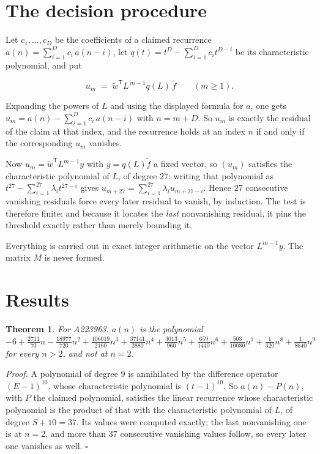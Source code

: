 \documentclass[11pt]{article}
\newtheorem{theorem}{Theorem}
\theoremstyle{definition}
\begin{document}
\section{The decision procedure}

Let $c_1,\dots,c_D$ be the coefficients of a claimed recurrence $a(n) = \sum_{i=1}^{D} c_i\,a(n-i)$, let $q(t) = t^{D} - \sum_{i=1}^{D} c_i t^{D-i}$ be its characteristic polynomial, and put

\[u_m \;=\; \tilde w^{\mathsf T} L^{\,m-1} q(L)\,\tilde f \qquad (m \ge 1).\]

Expanding the powers of $L$ and using the displayed formula for $a$, one gets $u_m = a(n) - \sum_{i=1}^{D} c_i\,a(n-i)$ with $n = m + D$. So $u_m$ is exactly the residual of the claim at that index, and the recurrence holds at an index $n$ if and only if the corresponding $u_m$ vanishes.

Now $u_m = \tilde w^{\mathsf T} L^{m-1} y$ with $y = q(L)\tilde f$ a fixed vector, so $(u_m)$ satisfies the characteristic polynomial of $L$, of degree $27$: writing that polynomial as $t^{27} - \sum_{i=1}^{27} \lambda_i t^{27-i}$ gives $u_{m+27} = \sum_{i=1}^{27} \lambda_i u_{m+27-i}$. Hence $27$ consecutive vanishing residuals force every later residual to vanish, by induction. The test is therefore finite; and because it locates the {\itshape last} nonvanishing residual, it pins the threshold exactly rather than merely bounding it.

Everything is carried out in exact integer arithmetic on the vector $L^{m-1}y$. The matrix $M$ is never formed.

\section{Results}

\begin{theorem} For A223963, $a(n)$ is the polynomial $-6 + \frac{2711}{70}n - \frac{18977}{720}n^{2} + \frac{106019}{2160}n^{3} + \frac{37141}{2880}n^{4} + \frac{3013}{960}n^{5} + \frac{659}{1440}n^{6} + \frac{503}{10080}n^{7} + \frac{1}{320}n^{8} + \frac{1}{8640}n^{9}$ for every $n > 2$, and not at $n = 2$.\end{theorem}

{\itshape Proof.} A polynomial of degree $9$ is annihilated by the difference operator $(E-1)^{10}$, whose characteristic polynomial is $(t-1)^{10}$. So $a(n) - P(n)$, with $P$ the claimed polynomial, satisfies the linear recurrence whose characteristic polynomial is the product of that with the characteristic polynomial of $L$, of degree $S + 10 = 37$. Its values were computed exactly; the last nonvanishing one is at $n = 2$, and more than $37$ consecutive vanishing values follow, so every later one vanishes as well. $\square$
\end{document}

